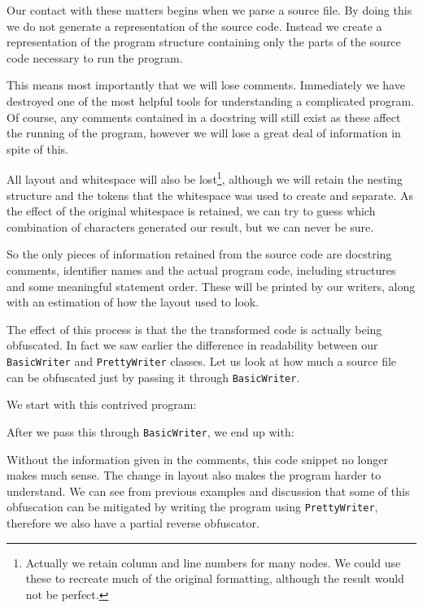 \documentclass[twoside,a4paper]{report}
\begin{document}
Our contact with these matters begins when we parse a source file. By doing this we do not generate a representation of
the source code. Instead we create a representation of the program structure containing only the parts of the source code
necessary to run the program.

This means most importantly that we will lose comments. Immediately we have destroyed one of the most helpful tools
for understanding a complicated program. Of course, any comments contained in a docstring will still exist as these
affect the running of the program, however we will lose a great deal of information in spite of this.

All layout and whitespace will also be lost\footnote{Actually we retain column and line numbers for many nodes. We could
use these to recreate much of the original formatting, although the result would not be perfect.}, although we will retain
the nesting structure and the tokens that the whitespace was used to create and separate. As the effect of the original
whitespace is retained, we can try to guess which combination of characters generated our result, but we can never be sure.

So the only pieces of information retained from the source code are docstring comments, identifier names and the actual
program code, including structures and some meaningful statement order. These will be printed by our writers, along with
an estimation of how the layout used to look.

The effect of this process is that the the transformed code is actually being obfuscated. In fact we saw earlier the difference
in readability between our \texttt{BasicWriter} and \texttt{PrettyWriter} classes. Let us look at how much a source file
can be obfuscated just by passing it through \texttt{BasicWriter}.

We start with this contrived program:



After we pass this through \texttt{BasicWriter}, we end up with:



Without the information given in the comments, this code snippet no longer makes much sense. The change in layout also
makes the program harder to understand. We can see from previous examples and discussion that some of this obfuscation
can be mitigated by writing the program using \texttt{PrettyWriter}, therefore we also have a partial reverse obfuscator.
\end{document}
